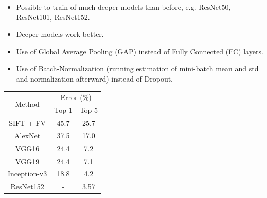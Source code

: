 \documentclass[9pt]{beamer}
\begin{document}
\begin{frame}
\begin{minipage}[t]{0.70\textwidth}
		\begin{itemize}
			\item Possible to train of much deeper models than before, e.g. ResNet50, ResNet101, ResNet152.
			\item Deeper models work better.
			\item Use of Global Average Pooling (GAP) instead of Fully Connected (FC) layers.
			\item Use of Batch-Normalization (running estimation of mini-batch mean and std and normalization afterward) instead of Dropout.
		\end{itemize}
		\begin{table}[]
		\centering
		\label{my-label}
		\begin{tabular}{|c|c|c|}
		\hline
		\multirow{2}{*}{Method} & \multicolumn{2}{c|}{Error (\%)} \\ \cline{2-3} 
		 & Top-1 & Top-5 \\ \hline
		SIFT + FV & 45.7 & 25.7 \\ \hline
		AlexNet & 37.5 & 17.0 \\ \hline
		VGG16 & 24.4 & 7.2 \\ \hline
		VGG19 & 24.4 & 7.1 \\ \hline
		Inception-v3 & 18.8 & 4.2 \\ \hline
		ResNet152 & - & 3.57 \\ \hline
		\end{tabular}
		\end{table}
		
	\end{minipage}
\end{frame}
\end{document}
